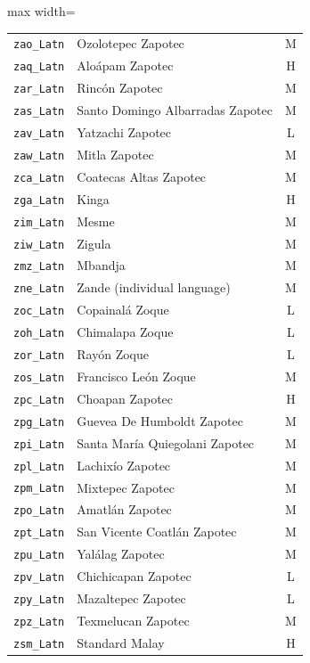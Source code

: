 {\begin{adjustbox}{max width=\textwidth}
\begin{tabular}{llc}
        \texttt{zao\_Latn} & Ozolotepec Zapotec & M \\
        \texttt{zaq\_Latn} & Aloápam Zapotec & H \\
        \texttt{zar\_Latn} & Rincón Zapotec & M \\
        \texttt{zas\_Latn} & Santo Domingo Albarradas Zapotec & M \\
        \texttt{zav\_Latn} & Yatzachi Zapotec & L \\
        \texttt{zaw\_Latn} & Mitla Zapotec & M \\
        \texttt{zca\_Latn} & Coatecas Altas Zapotec & M \\
        \texttt{zga\_Latn} & Kinga & H \\
        \texttt{zim\_Latn} & Mesme & M \\
        \texttt{ziw\_Latn} & Zigula & M \\
        \texttt{zmz\_Latn} & Mbandja & M \\
        \texttt{zne\_Latn} & Zande (individual language) & M \\
        \texttt{zoc\_Latn} & Copainalá Zoque & L \\
        \texttt{zoh\_Latn} & Chimalapa Zoque & L \\
        \texttt{zor\_Latn} & Rayón Zoque & L \\
        \texttt{zos\_Latn} & Francisco León Zoque & M \\
        \texttt{zpc\_Latn} & Choapan Zapotec & H \\
        \texttt{zpg\_Latn} & Guevea De Humboldt Zapotec & M \\
        \texttt{zpi\_Latn} & Santa María Quiegolani Zapotec & M \\
        \texttt{zpl\_Latn} & Lachixío Zapotec & M \\
        \texttt{zpm\_Latn} & Mixtepec Zapotec & M \\
        \texttt{zpo\_Latn} & Amatlán Zapotec & M \\
        \texttt{zpt\_Latn} & San Vicente Coatlán Zapotec & M \\
        \texttt{zpu\_Latn} & Yalálag Zapotec & M \\
        \texttt{zpv\_Latn} & Chichicapan Zapotec & L \\
        \texttt{zpy\_Latn} & Mazaltepec Zapotec & L \\
        \texttt{zpz\_Latn} & Texmelucan Zapotec & M \\
        \texttt{zsm\_Latn} & Standard Malay & H \\

\end{tabular}
\end{adjustbox}}
